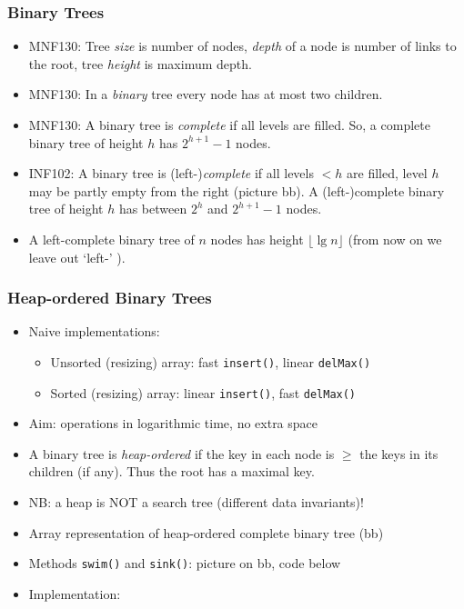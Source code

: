 \documentclass[handout]{beamer}
\newcommand{\git}{https://github.com/marcbezem/INF102/blob/master}
\begin{document}
\begin{frame}
    \frametitle{Binary Trees}

\begin{itemize}[<+->]

\item MNF130: Tree \emph{size} is number of nodes, 
\emph{depth} of a node is number of links to the root,
tree \emph{height} is maximum depth.

\item MNF130: In a \emph{binary} tree every node has at most two children.

\item MNF130: A binary tree is \emph{complete} if all levels are filled. So, a complete
binary tree of height $h$ has $2^{h{+}1} {-}1$ nodes.

\item INF102: A binary tree is (left-)\emph{complete} if all levels $<h$ are filled, 
level $h$ may be partly empty from the right (picture bb).
A (left-)complete binary tree of height $h$  has between
$2^{h}$ and $2^{h{+}1} {-}1$ nodes. 

\item A left-complete binary tree of $n$ nodes has  height $\lfloor\lg n\rfloor$
(from now on we leave out `left-' ).

\end{itemize}
\end{frame}

\begin{frame}
    \frametitle{Heap-ordered Binary Trees}
    
\begin{itemize}[<+->]

\item Naive implementations:
\begin{itemize}[<+->]
\item Unsorted (resizing) array: fast {\tt insert()}, linear {\tt delMax()}
\item Sorted (resizing) array: linear {\tt insert()}, fast {\tt delMax()}
\end{itemize}
\item Aim: operations in logarithmic time,  no extra space
\item A binary tree is \emph{heap-ordered} if the key in each node is $\geq$
the keys in its children (if any). Thus the root has a maximal key.
\item NB: a heap is NOT a search tree (different data invariants)!
\item Array representation of heap-ordered complete binary tree (bb)

\item Methods {\tt swim()} and {\tt sink()}: picture on bb, code below

\item Implementation:
\href{\git/programs/sorting/priorityQueues/ArrayListPQ.java}%
{\color{red}{ArrayListPQ.java}}
\end{itemize}     
\end{frame}
\end{document}
